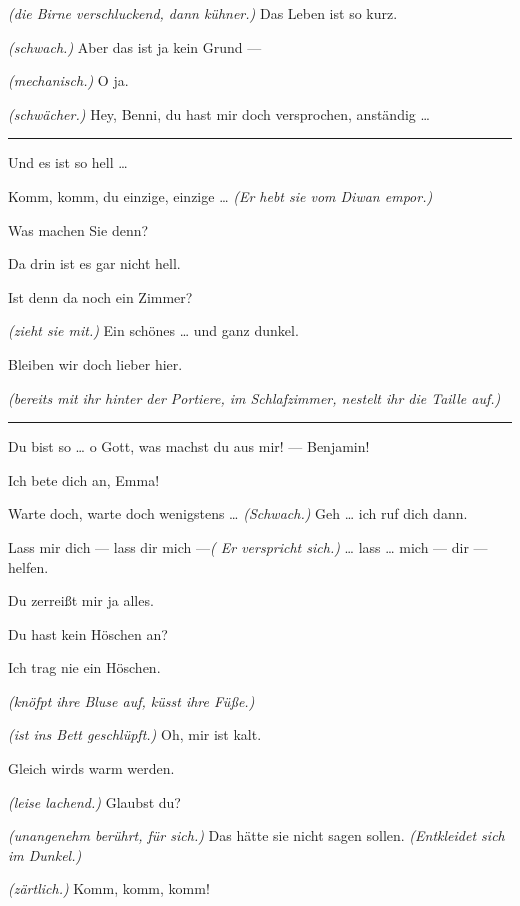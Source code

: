 \documentclass[
	final,
	a4paper,
	ngerman,
	mpinclude = true, %
	twoside = true,
	open = right,
	cleardoublepage = plain,
	DIV = 13,
	BCOR = 1cm,
	titlepage = firstiscover,
	]{scrbook}
\newcommand{\direction}[1]{\textit{(#1)}}
\newenvironment{deletion}{%
		\vspace{0.25\baselineskip}
		\hrule
		\vspace{0.25\baselineskip}
		\color{darkgray}
	}{
		\color{black}
		\vspace{0.25\baselineskip}
		\hrule 
		\vspace{0.25\baselineskip}
	}
\newcommand{\thecharacter}[1]{\textup{\textsc{#1}}\xspace}
\newcommand{\theherr}{\thecharacter{Benjamin}}
\newcommand{\thefrau}{\thecharacter{Emma}}
\newcommand{\character}[1]{\item[#1:]}
\newcommand{\herr}{\character{\theherr}}
\newcommand{\frau}{\character{\thefrau}}
\begin{document}
\begin{play}
	\herr
	\direction{die Birne verschluckend, dann kühner.} Das Leben ist so kurz.

	\frau
	\direction{schwach.} Aber das ist ja kein Grund ---

	\herr
	\direction{mechanisch.} O ja.

	\frau
	\direction{schwächer.} Hey, Benni, du hast mir doch versprochen, anständig \ldots{}
	\begin{deletion}
	Und es ist so hell \ldots{}

	\herr
	Komm, komm, du einzige, einzige \ldots{} \direction{Er hebt sie vom Diwan empor.}

	\frau
	Was machen Sie denn?

	\herr
	Da drin ist es gar nicht hell.

	\frau
	Ist denn da noch ein Zimmer?

	\herr
	\direction{zieht sie mit.} Ein schönes \ldots{} und ganz dunkel.

	\frau
	Bleiben wir doch lieber hier.

	\herr
	\direction{bereits mit ihr hinter der Portiere, im Schlafzimmer, nestelt ihr die Taille auf.}

	\frau
	\end{deletion}
	Du bist so \ldots{} o Gott, was machst du aus mir! --- Benjamin!

	\herr
	Ich bete dich an, Emma!

	\frau
	Warte doch, warte doch wenigstens \ldots{} \direction{Schwach.} Geh \ldots{} ich ruf dich dann.

	\herr
	Lass mir dich --- lass dir mich ---\direction{ Er verspricht sich.} \ldots{} lass \ldots{} mich --- dir --- helfen.

	\frau
	Du zerreißt mir ja alles.

	\herr
	Du hast kein Höschen an?

	\frau
	Ich trag nie ein Höschen.

	\herr
	\direction{knöfpt ihre Bluse auf, küsst ihre Füße.}

	\frau
	\direction{ist ins Bett geschlüpft.} Oh, mir ist kalt.

	\herr
	Gleich wirds warm werden.

	\frau
	\direction{leise lachend.} Glaubst du?

	\herr
	\direction{unangenehm berührt, für sich.} Das hätte sie nicht sagen sollen. \direction{Entkleidet sich im Dunkel.}

	\frau
	\direction{zärtlich.} Komm, komm, komm!


\end{play}
\end{document}
